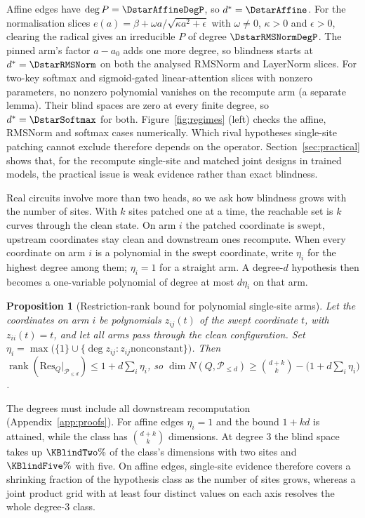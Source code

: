 \documentclass{article}
\theoremstyle{plain}
\newtheorem{proposition}[theorem]{Proposition}
\theoremstyle{definition}
\begin{document}
Affine edges have $\deg P=\DstarAffineDegP$, so $d^*=\DstarAffine$. For the normalisation slices
$e(a)=\beta+\omega a/\sqrt{\kappa a^2+\epsilon}$ with $\omega\neq0$, $\kappa>0$ and $\epsilon>0$, clearing the radical
gives an irreducible $P$ of degree $\DstarRMSNormDegP$. The pinned arm's factor $a-a_0$ adds one more degree, so blindness starts at
$d^*=\DstarRMSNorm$ on both the analysed RMSNorm and LayerNorm slices. For two-key softmax and
sigmoid-gated linear-attention slices with nonzero parameters, no nonzero polynomial vanishes on the recompute arm (a
separate lemma). Their blind spaces are zero at every finite degree, so $d^*=\DstarSoftmax$ for both.
Figure~\ref{fig:regimes} (left) checks the affine, RMSNorm and softmax cases numerically. Which rival hypotheses single-site patching cannot exclude therefore depends on the operator.
Section~\ref{sec:practical} shows that, for the recompute single-site and matched joint designs in trained models, the
practical issue is weak evidence rather than exact blindness.

Real circuits involve more than two heads, so we ask how
blindness grows with the number of sites. With $k$ sites patched one at a time, the reachable set is $k$ curves
through the clean state. On arm $i$ the patched coordinate is swept, upstream coordinates stay clean and downstream ones
recompute. When every coordinate on arm $i$ is a polynomial in the swept coordinate, write $\eta_i$ for the highest degree among
them; $\eta_i=1$ for a straight arm. A degree-$d$ hypothesis then becomes a one-variable
polynomial of degree at most $d\eta_i$ on that arm.

\begin{proposition}[Restriction-rank bound for polynomial single-site arms]
\label{prop:ksite}
Let the coordinates on arm $i$ be polynomials $z_{ij}(t)$ of the swept coordinate $t$, with $z_{ii}(t)=t$, and let all
arms pass through the clean configuration. Set $\eta_i=\max\bigl(\{1\}\cup\{\deg z_{ij}:z_{ij}\text{
nonconstant}\}\bigr)$. Then $\operatorname{rank}(\mathrm{Res}_Q|_{\mathcal P_{\le d}})\le1+d\sum_i\eta_i$, so
$\dim N(Q,\mathcal P_{\le d})\ge\binom{d+k}{k}-\bigl(1+d\sum_i\eta_i\bigr)$.
\end{proposition}

The degrees must include all downstream recomputation (Appendix~\ref{app:proofs}). For affine edges $\eta_i=1$ and the
bound $1+kd$ is attained, while the class has $\binom{d+k}{k}$ dimensions. At degree $3$ the blind space takes up
$\KBlindTwo\%$ of the class's dimensions with two sites and $\KBlindFive\%$ with five. On affine edges, single-site evidence therefore covers a shrinking fraction of the hypothesis class as the number of
sites grows, whereas a joint product grid with at least four distinct values on each axis resolves the whole degree-$3$
class.
\end{document}
